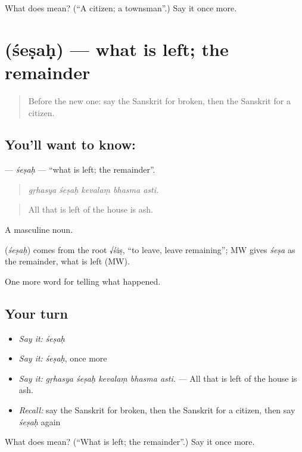\begin{tcolorbox}[breakable,colback=teal!4,colframe=teal!35!black,title={Before you move on}]
What does  mean? (\textquotedblleft{}A citizen; a townsman\textquotedblright{}.) Say it once more.
\end{tcolorbox}
\section[\texorpdfstring{\sk{शेषः} (śeṣaḥ)}{शेषः (śeṣaḥ)}]{ (śeṣaḥ) — what is left; the remainder}

\label{lesson:SA-C298-sesah}



\begin{quote}
Before the new one: say the Sanskrit for broken, then the Sanskrit for a citizen.
\end{quote}

\subsection*{You'll want to know: }
\textbf{} — \emph{śeṣaḥ} — \textquotedblleft{}what is left; the remainder\textquotedblright{}.

\begin{quote}
    
\end{quote}

\begin{quote}
\emph{gṛhasya śeṣaḥ kevalaṃ bhasma asti.}
\end{quote}

\begin{quote}
All that is left of the house is ash.
\end{quote}

A masculine noun.

\begin{cousinweb}
\textbf{} (\emph{śeṣaḥ}) comes from the root √śiṣ, \textquotedblleft{}to leave, leave remaining\textquotedblright{}; MW gives \emph{śeṣa} as the remainder, what is left (MW).
\end{cousinweb}

\begin{grammarlens}[title={What you've built}]
One more word for telling what happened.
\end{grammarlens}

\subsection*{Your turn}
\begin{itemize}
\raggedright
  \item \emph{Say it:} \emph{śeṣaḥ}
  \item \emph{Say it:} \emph{śeṣaḥ}, once more
  \item \emph{Say it:} \emph{gṛhasya śeṣaḥ kevalaṃ bhasma asti.} — All that is left of the house is ash.
  \item \emph{Recall:} say the Sanskrit for broken, then the Sanskrit for a citizen, then say \emph{śeṣaḥ} again
\end{itemize}

\begin{tcolorbox}[breakable,colback=teal!4,colframe=teal!35!black,title={Before you move on}]
What does  mean? (\textquotedblleft{}What is left; the remainder\textquotedblright{}.) Say it once more.
\end{tcolorbox}
